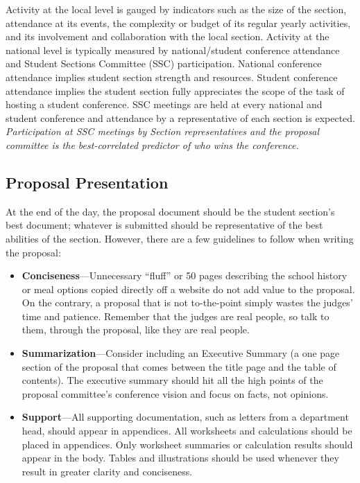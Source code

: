\documentclass[12pt]{article}
\begin{document}
Activity at the local level is gauged by indicators such as the size of the section, attendance at its events, the complexity or budget of its regular yearly activities, and its involvement and collaboration with the local section.
Activity at the national level is typically measured by national/student conference attendance and Student Sections Committee (SSC) participation. National conference attendance implies student section strength and resources.
Student conference attendance implies the student section fully appreciates the scope of the task of hosting a student conference.
SSC meetings are held at every national and student conference and attendance by a representative of each section is expected.
\textit{Participation at SSC meetings by Section representatives and the
proposal committee is the best-correlated predictor of who wins the conference.}

\subsection{Proposal Presentation}
At the end of the day, the proposal document should be the student section's best document; whatever is submitted should be representative of the best abilities of the section. However, there are a few guidelines to follow when writing the proposal:
\begin{itemize}
\item{\textbf{Conciseness}---Unnecessary ``fluff” or 50 pages describing the school history or meal options copied directly off a website do not add value to the proposal. On the contrary, a proposal that is not to-the-point simply wastes the judges’ time and patience. Remember that the judges
are real people, so talk to them, through the proposal, like they are real people.}

\item{\textbf{Summarization}---Consider including an Executive Summary (a one page section of the proposal that comes
between the title page and the table of contents). The executive summary should hit all
the high points of the proposal committee's conference vision and focus on facts, not opinions.}

\item{\textbf{Support}---All supporting documentation, such as letters from a department head, should appear in appendices. All worksheets and calculations should be placed in appendices. Only worksheet summaries or calculation results should appear in the body. Tables and illustrations should be used whenever they result in greater clarity and conciseness.}
\end{itemize}
\end{document}
